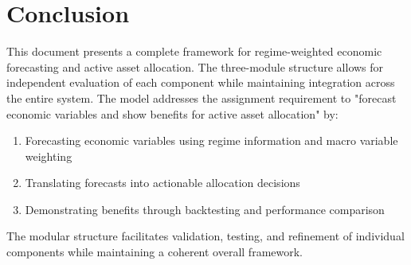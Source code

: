 \documentclass[11pt,a4paper]{article}
\begin{document}
\section{Conclusion}

This document presents a complete framework for regime-weighted economic forecasting and active asset allocation. The three-module structure allows for independent evaluation of each component while maintaining integration across the entire system. The model addresses the assignment requirement to "forecast economic variables and show benefits for active asset allocation" by:

\begin{enumerate}
    \item Forecasting economic variables using regime information and macro variable weighting
    \item Translating forecasts into actionable allocation decisions
    \item Demonstrating benefits through backtesting and performance comparison
\end{enumerate}

The modular structure facilitates validation, testing, and refinement of individual components while maintaining a coherent overall framework.
\end{document}
